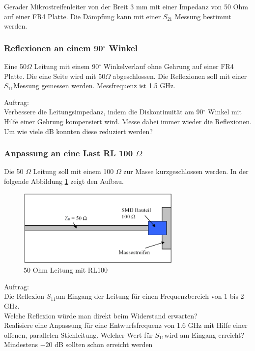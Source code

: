 Gerader Mikrostreifenleiter von der Breit 3 mm mit einer Impedanz von 50 Ohm auf einer FR4 Platte. Die Dämpfung kann mit einer $S_{21}$ Messung bestimmt werden.

\subsubsection{Reflexionen an einem 90$^\circ$ Winkel}
Eine 50$\Omega$ Leitung mit einem 90$^\circ$ Winkelverlauf ohne Gehrung auf einer FR4 Platte. Die eine Seite wird mit 50$\Omega$ abgeschlossen.
Die Reflexionen soll mit einer $S_{11} $Messung gemessen werden. Messfrequenz ist 1.5 GHz.

Auftrag:\\
Verbessere die Leitungsimpedanz, indem die Diskontinuität am  90$^\circ$ Winkel mit Hilfe einer Gehrung kompensiert wird. Messe dabei immer wieder die Reflexionen. Um wie viele dB konnten diese reduziert werden?


\subsubsection{Anpassung an eine Last RL 100 $\Omega$}
Die 50 $\Omega$ Leitung soll mit einem 100 $\Omega$ zur Masse  kurzgeschlossen werden. In der folgende Abbildung \ref{RL100} zeigt den Aufbau.

\begin{figure}[h!]
	\centering
		\includegraphics[width=8cm]{content/Bilder/50OhmLeitungRL100.png}
	\caption{50 Ohm Leitung mit RL100}%
	\label{RL100}
\end{figure}

Auftrag:\\
Die Reflexion $S_{11} $am Eingang der Leitung für einen Frequenzbereich von 1 bis 2 GHz. \\
Welche Reflexion würde man direkt beim Widerstand erwarten? \\
Realisiere eine Anpassung für eine Entwurfsfrequenz von 1.6 GHz mit Hilfe einer offenen, parallelen Stichleitung. Welcher Wert für $S_{11} $wird am Eingang erreicht? Mindestens $-20$ dB sollten schon erreicht werden 